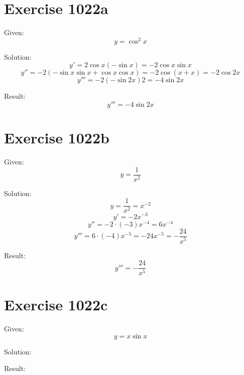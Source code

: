\documentclass[a4paper, 10pt]{scrartcl}
\begin{document}
\section{Exercise 1022a}

Given:
\[
y = \cos^{2}{x}
\]

Solution:
\[
y' = 2\cos{x}(-\sin{x}) = -2\cos{x}\sin{x}
\]
\[
y'' = -2(-\sin{x}\sin{x} + \cos{x}\cos{x}) = -2\cos{(x + x)} = -2\cos{2x}
\]
\[
y''' = -2(-\sin{2x})2 = -4\sin{2x}
\]

Result:
\[
y''' = -4\sin{2x}
\]

\section{Exercise 1022b}

Given:
\[
y = \frac{1}{x^{2}}
\]

Solution:
\[
y = \frac{1}{x^{2}} = x^{-2}
\]
\[
y' = -2x^{-3}
\]
\[
y'' = -2\cdot (-3)x^{-4} = 6x^{-4}
\]
\[
y''' = 6\cdot (-4)x^{-5} = -24x^{-5} = -\frac{24}{x^{5}}
\]

Result:
\[
y''' = -\frac{24}{x^{5}}
\]

\section{Exercise 1022c}

Given:
\[
y = x\sin{x}
\]

Solution:

Result:
\end{document}

